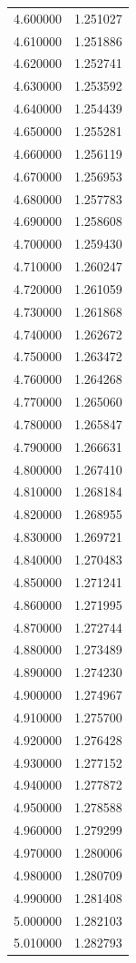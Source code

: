 \begin{tabular}{rr}
4.600000 & 1.251027 \\
4.610000 & 1.251886 \\
4.620000 & 1.252741 \\
4.630000 & 1.253592 \\
4.640000 & 1.254439 \\
4.650000 & 1.255281 \\
4.660000 & 1.256119 \\
4.670000 & 1.256953 \\
4.680000 & 1.257783 \\
4.690000 & 1.258608 \\
4.700000 & 1.259430 \\
4.710000 & 1.260247 \\
4.720000 & 1.261059 \\
4.730000 & 1.261868 \\
4.740000 & 1.262672 \\
4.750000 & 1.263472 \\
4.760000 & 1.264268 \\
4.770000 & 1.265060 \\
4.780000 & 1.265847 \\
4.790000 & 1.266631 \\
4.800000 & 1.267410 \\
4.810000 & 1.268184 \\
4.820000 & 1.268955 \\
4.830000 & 1.269721 \\
4.840000 & 1.270483 \\
4.850000 & 1.271241 \\
4.860000 & 1.271995 \\
4.870000 & 1.272744 \\
4.880000 & 1.273489 \\
4.890000 & 1.274230 \\
4.900000 & 1.274967 \\
4.910000 & 1.275700 \\
4.920000 & 1.276428 \\
4.930000 & 1.277152 \\
4.940000 & 1.277872 \\
4.950000 & 1.278588 \\
4.960000 & 1.279299 \\
4.970000 & 1.280006 \\
4.980000 & 1.280709 \\
4.990000 & 1.281408 \\
5.000000 & 1.282103 \\
5.010000 & 1.282793 \\

\end{tabular}
